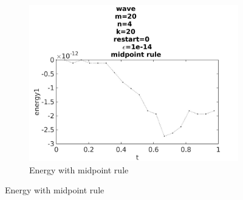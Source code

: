 \begin{figure}[H]
\begin{subfigure}[b]{0.30\textwidth}
                \label{fig:energyovertimeeuler}
        \end{subfigure}
        \begin{subfigure}[b]{0.30\textwidth}
                \includegraphics[width=\textwidth]{../MATLAB/fig/energyovertimemidpoint.jpg}
                \caption{ Energy with midpoint rule }
                \label{fig:energyovertimemidpoint}
        \end{subfigure}
        

\end{figure}
